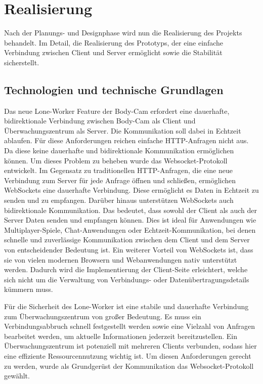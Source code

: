 \documentclass[thesis.tex]{subfiles}
\begin{document}
\chapter{Realisierung}\label{chap:realisierung}

Nach der Planungs- und Designphase wird nun die Realisierung des Projekts behandelt. Im Detail, die Realisierung des Prototyps, der eine einfache Verbindung zwischen Client und Server ermöglicht sowie die Stabilität sicherstellt.

\section{Technologien und technische Grundlagen}\label{chap:technologien}

Das neue Lone-Worker Feature der Body-Cam erfordert eine dauerhafte, bidirektionale Verbindung zwischen Body-Cam als Client und Überwachungszentrum als Server.
Die Kommunikation soll dabei in Echtzeit ablaufen.
Für diese Anforderungen reichen einfache HTTP-Anfragen nicht aus.
Da diese keine dauerhafte und bidirektionale Kommunikation ermöglichen können.
Um dieses Problem zu beheben wurde das Websocket-Protokoll entwickelt.
Im Gegensatz zu traditionellen HTTP-Anfragen, die eine neue Verbindung zum Server für jede Anfrage öffnen und schließen, ermöglichen WebSockets eine dauerhafte Verbindung.
Diese ermöglicht es Daten in Echtzeit zu senden und zu empfangen.
Darüber hinaus unterstützen WebSockets auch bidirektionale Kommunikation.
Das bedeutet, dass sowohl der Client als auch der Server Daten senden und empfangen können.
Dies ist ideal für Anwendungen wie Multiplayer-Spiele, Chat-Anwendungen oder Echtzeit-Kommunikation, bei denen schnelle und zuverlässige Kommunikation zwischen dem Client und dem Server von entscheidender Bedeutung ist.
Ein weiterer Vorteil von WebSockets ist, dass sie von vielen modernen Browsern und Webanwendungen nativ unterstützt werden.
Dadurch wird die Implementierung der Client-Seite erleichtert, welche sich nicht um die Verwaltung von Verbindungs- oder Datenübertragungsdetails kümmern muss. \cite[vgl. S.4f]{WebsocketProtokoll}

Für die Sicherheit des Lone-Worker ist eine stabile und dauerhafte Verbindung zum Überwachungszentrum von großer Bedeutung.
Es muss ein Verbindungsabbruch schnell festgestellt werden sowie eine Vielzahl von Anfragen bearbeitet werden, um aktuelle Informationen jederzeit bereitzustellen.
Ein Überwachungszentrum ist potenziell mit mehreren Clients verbunden, sodass hier eine effiziente Ressourcennutzung wichtig ist.
Um diesen Anforderungen gerecht zu werden, wurde als Grundgerüst der Kommunikation das Websocket-Protokoll gewählt.
\end{document}
